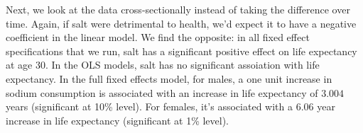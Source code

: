 \documentclass[11pt]{article}\usepackage[]{graphicx}\usepackage[]{color}
\begin{document}
Next, we look at the data cross-sectionally instead of taking the difference over time.
Again, if salt were detrimental to health, we'd expect it to have a negative coefficient in the linear model.
We find the opposite: in all fixed effect specifications that we run, salt has a significant positive effect on life expectancy at age 30.
In the OLS models, salt has no significant assoiation with life expectancy.
In the full fixed effects model, for males, a one unit increase in sodium consumption is associated with an increase in life expectancy of $3.004$ years (significant at 10\% level).
For females, it's associated with a $6.06$ year increase in life expectancy (significant at 1\% level).


\end{document}

